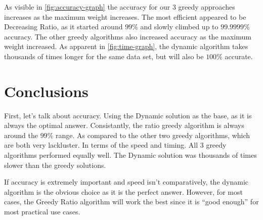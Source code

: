 \documentclass[10pt, letterpaper]{article}
\begin{document}
As visible in \ref{fig:accuracy-graph} the accuracy for our 3 greedy approaches increases as the maximum weight increases. The most efficient appeared to be Decreasing Ratio, as it started around $99\%$ and slowly climbed up to $99.9999\%$ accuracy.
The other greedy algorithms also increased accuracy as the maximum weight increased.
As apparent in \ref{fig:time-graph}, the dynamic algorithm takes thousands of times longer for the same data set, but will also be $100\%$ accurate.

\section{Conclusions}
First, let's talk about accuracy. Using the Dynamic solution as the base, as it is always the optimal answer. Consistantly, the ratio greedy algorithm is always around the $99\%$ range. As compared to the other two greedy algorithms, which are both very lackluster. In terms of the speed and timing. All 3 greedy algorithms performed equally well. The Dynamic solution was thousands of times slower than the greedy solutions.

\medskip

If accuracy is extremely important and speed isn't comparatively, the dynamic algorithm is the obvious choice as it is the perfect answer. However, for most cases, the Greedy Ratio algorithm will work the best since it is ``good enough'' for most practical use cases.
\end{document}
